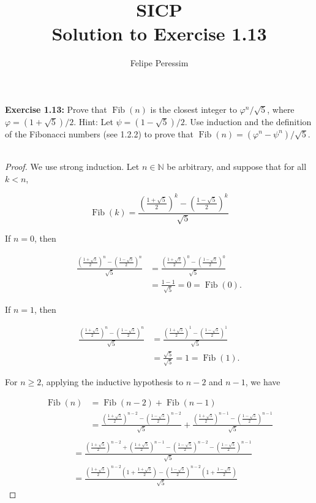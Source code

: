 \documentclass[a4paper,12pt]{article}
\begin{document}
\title{SICP\\ Solution to Exercise 1.13}
\author{Felipe Peressim}

\date{}
\maketitle

\textbf{Exercise 1.13:} Prove that $\operatorname{Fib}(n)$ is the closest integer to $\varphi^{n}/\sqrt{5}$, where $\varphi=(1+\sqrt{5})/2$.
Hint: Let $\psi=(1-\sqrt{5})/2$. Use induction and the definition of the Fibonacci numbers (see 1.2.2)
to prove that $\operatorname{Fib}(n)=(\varphi^{n}-\psi^{n})/\sqrt{5}$.\\ \\

\begin{proof}
  We use strong induction. Let $n \in \mathbb{N}$ be arbitrary, and suppose that for all $k < n$,

 
  $$\operatorname{Fib}(k)=\frac{\left(\frac{1+\sqrt{5}}{2}\right)^{k}-\left(\frac{1-\sqrt{5}}{2}\right)^{k}}{\sqrt{5}}$$

  If $n = 0$, then

\begin{align*}
  \frac{\left(\frac{1+\sqrt{5}}{2}\right)^{n}-\left(\frac{1-\sqrt{5}}{2}\right)^{n}}{\sqrt{5}}
  &=\frac{\left(\frac{1+\sqrt{5}}{2}\right)^{0}-\left(\frac{1-\sqrt{5}}{2}\right)^{0}}{\sqrt{5}} \\
  &=\frac{1-1}{\sqrt{5}}=0=\operatorname{Fib}(0).
\end{align*}

If $n = 1$, then

\begin{align*}
  \frac{\left(\frac{1+\sqrt{5}}{2}\right)^{n}-\left(\frac{1-\sqrt{5}}{2}\right)^{n}}{\sqrt{5}}
  &=\frac{\left(\frac{1+\sqrt{5}}{2}\right)^{1}-\left(\frac{1-\sqrt{5}}{2}\right)^{1}}{\sqrt{5}} \\
  &=\frac{\sqrt{5}}{\sqrt{5}}=1=\operatorname{Fib}(1).
\end{align*}


For $n \geq 2$, applying the inductive hypothesis to $n-2$ and $n-1$, we have


\begin{align*}
  \operatorname{Fib}(n) &= \operatorname{Fib}(n-2) + \operatorname{Fib}(n-1)\\
  &=\frac{\left(\frac{1+\sqrt{5}}{2}\right)^{n-2} - \left(\frac{1-\sqrt{5}}{2}\right)^{n-2}}{\sqrt{5}} +
    \frac{\left(\frac{1+\sqrt{5}}{2}\right)^{n-1} - \left(\frac{1-\sqrt{5}}{2}\right)^{n-1}}{\sqrt{5}}\\
\end{align*}
\begin{align*}
  &=\frac{\left(\frac{1+\sqrt{5}}{2}\right)^{n-2}+\left(\frac{1+\sqrt{5}}{2}\right)^{n-1} -
    \left(\frac{1-\sqrt{5}}{2}\right)^{n-2}-\left(\frac{1-\sqrt{5}}{2}\right)^{n-1}}{\sqrt{5}}\\
  &= \frac{\left(\frac{1+\sqrt{5}}{2}\right)^{n-2}\left(1+\frac{1+\sqrt{5}}{2}\right)-\left(\frac{1-\sqrt{5}}{2}\right)^{n-2}\left(1+\frac{1-\sqrt{5}}{2}\right)}{\sqrt{5}}
\end{align*}


\end{proof}
\end{document}
